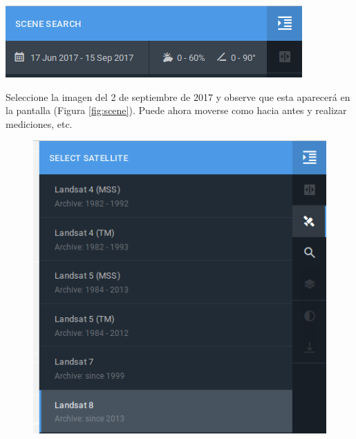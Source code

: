 \documentclass[a4paper,12pt]{book}
\begin{document}
\begin{center}\includegraphics[scale=0.4]{in:nubes.png}\end{center}

Seleccione la imagen del 2 de septiembre de 2017 y observe que esta aparecerá en la pantalla (Figura \ref{fig:scene}). Puede ahora moverse como hacia antes y realizar mediciones, etc.

\begin{figure}[h!]
\centering
\begin{minipage}{.425\linewidth}
  \includegraphics[width=\linewidth]{fig:sat.png}
\end{minipage}
\hspace{.05\linewidth}
\begin{minipage}{.425\linewidth}

\end{minipage}
\end{figure}
\end{document}
